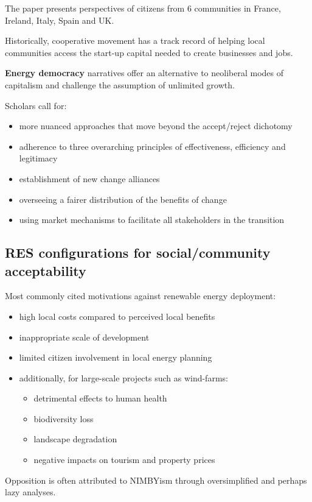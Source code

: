 The paper presents perspectives of citizens from 6 communities in France,
Ireland, Italy, Spain and UK.

Historically, cooperative movement has a track record of helping local
communities access the start-up capital needed to create businesses and jobs.

\textbf{Energy democracy} narratives offer an alternative to neoliberal modes
of capitalism and challenge the assumption of unlimited growth.

Scholars call for:
\begin{itemize}
	\item more nuanced approaches that move beyond the accept/reject
	dichotomy
	\item adherence to three overarching principles of effectiveness,
	efficiency and legitimacy
	\item establishment of new change alliances
	\item overseeing a fairer distribution of the benefits of change
	\item using market mechanisms to facilitate all stakeholders in the
	transition
\end{itemize}

\subsection{RES configurations for social/community acceptability}

Most commonly cited motivations against renewable energy deployment:
\begin{itemize}
	\item high local costs compared to perceived local benefits
	\item inappropriate scale of development
	\item limited citizen involvement in local energy planning
	\item additionally, for large-scale projects such as wind-farms:
	\begin{itemize}
		\item detrimental effects to human health
		\item biodiversity loss
		\item landscape degradation
		\item negative impacts on tourism and property prices
	\end{itemize}
\end{itemize}

Opposition is often attributed to NIMBYism through oversimplified and perhaps
lazy analyses.

